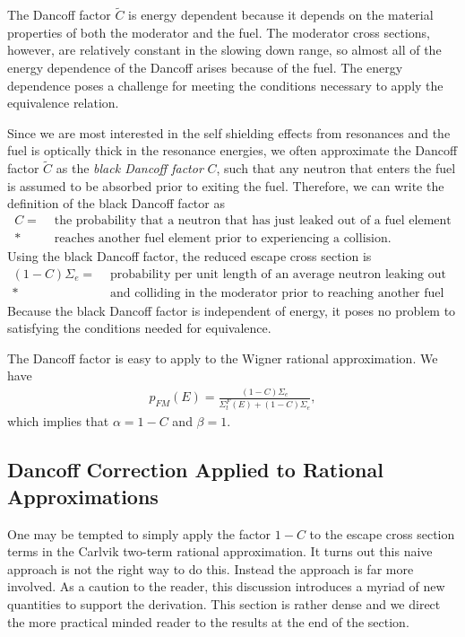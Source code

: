 The Dancoff factor $\tilde{C}$ is energy dependent because it depends on the material properties of both the moderator and the fuel. The moderator cross sections, however, are relatively constant in the slowing down range, so almost all of the energy dependence of the Dancoff arises because of the fuel. The energy dependence poses a challenge for meeting the conditions necessary to apply the equivalence relation.

Since we are most interested in the self shielding effects from resonances and the fuel is optically thick in the resonance energies, we often approximate the Dancoff factor $\widetilde{C}$ as the \emph{black Dancoff factor} $C$, such that any neutron that enters the fuel is assumed to be absorbed prior to exiting the fuel. Therefore, we can write the definition of the black Dancoff factor as
\begin{align}
  C = &\text{ the probability that a neutron that has just leaked out of a fuel element} \nonumber \\*
      &\text{ reaches another fuel element prior to experiencing a collision.} \nonumber
\end{align}
Using the black Dancoff factor, the reduced escape cross section is 
\begin{align}
  (1 - C) \Sigma_e = &\text{ probability per unit length of an average neutron leaking out of the fuel } \nonumber \\* 
  &\text{ and colliding in the moderator prior to reaching another fuel element.} \nonumber
\end{align}
Because the black Dancoff factor is independent of energy, it poses no problem to satisfying the conditions needed for equivalence.

The Dancoff factor is easy to apply to the Wigner rational approximation. We have
\begin{align}
  p_{FM}(E) = \frac{ ( 1 - C ) \Sigma_e }{ \Sigma_t^F(E) + ( 1 - C ) \Sigma_e },
\end{align}
which implies that $\alpha = 1 - C$ and $\beta = 1$.


\subsection{Dancoff Correction Applied to Rational Approximations}

One may be tempted to simply apply the factor $1 - C$ to the escape cross section terms in the Carlvik two-term rational approximation. It turns out this naive approach is not the right way to do this. Instead the approach is far more involved. As a caution to the reader, this discussion introduces a myriad of new quantities to support the derivation. This section is rather dense and we direct the more practical minded reader to the results at the end of the section.

